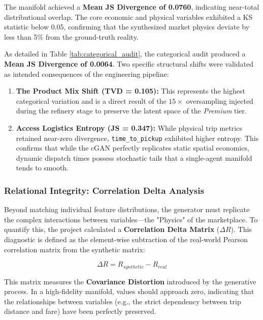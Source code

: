The manifold achieved a \textbf{Mean JS Divergence of 0.0760}, indicating near-total distributional overlap. The core economic and physical variables exhibited a KS statistic below 0.05, confirming that the synthesized market physics deviate by less than 5\% from the ground-truth reality. 

As detailed in Table \ref{tab:categorical_audit}, the categorical audit produced a \textbf{Mean JS Divergence of 0.0064}. Two specific structural shifts were validated as intended consequences of the engineering pipeline:

\begin{enumerate}
    \item \textbf{The Product Mix Shift (TVD = 0.105):} This represents the highest categorical variation and is a direct result of the $15\times$ oversampling injected during the refinery stage to preserve the latent space of the \textit{Premium} tier.
    \item \textbf{Access Logistics Entropy (JS = 0.347):} While physical trip metrics retained near-zero divergence, \texttt{time\_to\_pickup} exhibited higher entropy. This confirms that while the cGAN perfectly replicates static spatial economics, dynamic dispatch times possess stochastic tails that a single-agent manifold tends to smooth.
\end{enumerate}

\subsubsection{Relational Integrity: Correlation Delta Analysis}
Beyond matching individual feature distributions, the generator must replicate the complex interactions between variables---the "Physics" of the marketplace. To quantify this, the project calculated a \textbf{Correlation Delta Matrix} ($\Delta R$). This diagnostic is defined as the element-wise subtraction of the real-world Pearson correlation matrix from the synthetic matrix:

\begin{equation}
    \Delta R = R_{synthetic} - R_{real}
\end{equation}

This matrix measures the \textbf{Covariance Distortion} introduced by the generative process. In a high-fidelity manifold, values should approach zero, indicating that the relationships between variables (e.g., the strict dependency between trip distance and fare) have been perfectly preserved.


